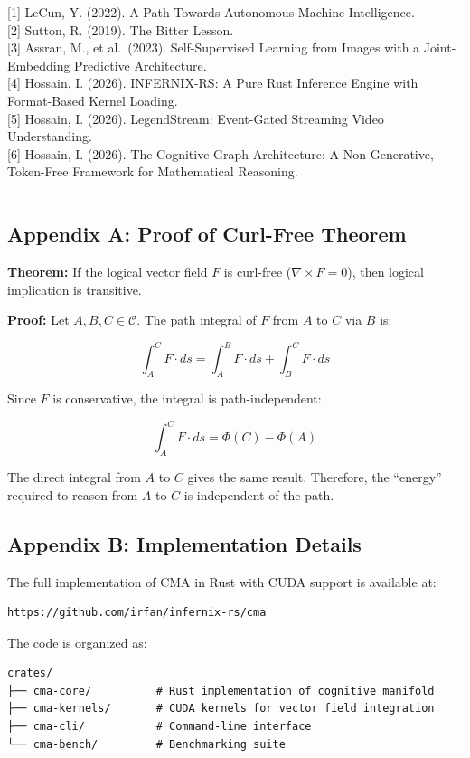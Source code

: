 \documentclass[
  11pt,
  a4paper,
]{article}
\begin{document}
{[}1{]} LeCun, Y. (2022). A Path Towards Autonomous Machine
Intelligence.\\
{[}2{]} Sutton, R. (2019). The Bitter Lesson.\\
{[}3{]} Assran, M., et al.~(2023). Self-Supervised Learning from Images
with a Joint-Embedding Predictive Architecture.\\
{[}4{]} Hossain, I. (2026). INFERNIX-RS: A Pure Rust Inference Engine
with Format-Based Kernel Loading.\\
{[}5{]} Hossain, I. (2026). LegendStream: Event-Gated Streaming Video
Understanding.\\
{[}6{]} Hossain, I. (2026). The Cognitive Graph Architecture: A
Non-Generative, Token-Free Framework for Mathematical Reasoning.

\begin{center}\rule{0.5\linewidth}{0.5pt}\end{center}

\subsection{Appendix A: Proof of Curl-Free
Theorem}\label{appendix-a-proof-of-curl-free-theorem}

\textbf{Theorem:} If the logical vector field \(F\) is curl-free
(\(\nabla \times F = 0\)), then logical implication is transitive.

\textbf{Proof:} Let \(A, B, C \in \mathcal{C}\). The path integral of
\(F\) from \(A\) to \(C\) via \(B\) is:

\[\int_A^C F \cdot ds = \int_A^B F \cdot ds + \int_B^C F \cdot ds\]

Since \(F\) is conservative, the integral is path-independent:

\[\int_A^C F \cdot ds = \Phi(C) - \Phi(A)\]

The direct integral from \(A\) to \(C\) gives the same result.
Therefore, the ``energy'' required to reason from \(A\) to \(C\) is
independent of the path.

\subsection{Appendix B: Implementation
Details}\label{appendix-b-implementation-details}

The full implementation of CMA in Rust with CUDA support is available
at:

\begin{verbatim}
https://github.com/irfan/infernix-rs/cma
\end{verbatim}

The code is organized as:

\begin{verbatim}
crates/
├── cma-core/          # Rust implementation of cognitive manifold
├── cma-kernels/       # CUDA kernels for vector field integration
├── cma-cli/           # Command-line interface
└── cma-bench/         # Benchmarking suite
\end{verbatim}
\end{document}
